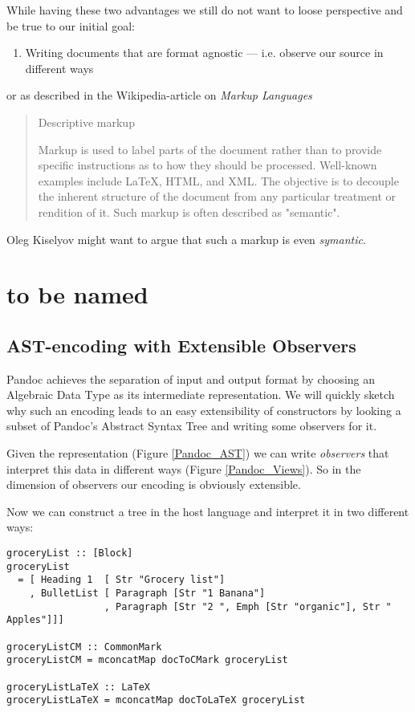 \documentclass[format=acmsmall, review=true, screen=true]{acmart}
\begin{document}
While having these two advantages we still do not want to loose perspective and
be true to our initial goal:

\begin{enumerate}
\item Writing documents that are format agnostic — i.e. observe our source in
different ways
\end{enumerate}

or as described in the Wikipedia-article on \emph{Markup Languages}

\begin{quote}
Descriptive markup

Markup is used to label parts of the document rather than to provide specific
instructions as to how they should be processed. Well-known examples include
\LaTeX{}, HTML, and XML. The objective is to decouple the inherent structure of the
document from any particular treatment or rendition of it. Such markup is often
described as "semantic".
\end{quote}

Oleg Kiselyov might want to argue that such a markup is even \emph{symantic}.

\section{to be named}
\label{sec:org7537ecb}
\subsection{AST-encoding with Extensible Observers}
\label{sec:org5f9818b}

Pandoc achieves the separation of input and output format by choosing an
Algebraic Data Type as its intermediate representation. We will quickly sketch
why such an encoding leads to an easy extensibility of constructors by looking a
subset of Pandoc's Abstract Syntax Tree and writing some observers for it.

Given the representation (Figure \ref{Pandoc_AST}) we can write \emph{observers}
that interpret this data in different ways (Figure \ref{Pandoc_Views}). So in the
dimension of observers our encoding is obviously extensible.

Now we can construct a tree in the host language and interpret it in two
different ways:
\begin{lstlisting}
groceryList :: [Block]
groceryList
  = [ Heading 1  [ Str "Grocery list"]
    , BulletList [ Paragraph [Str "1 Banana"]
                 , Paragraph [Str "2 ", Emph [Str "organic"], Str " Apples"]]]

groceryListCM :: CommonMark
groceryListCM = mconcatMap docToCMark groceryList

groceryListLaTeX :: LaTeX
groceryListLaTeX = mconcatMap docToLaTeX groceryList
\end{lstlisting}
\end{document}
